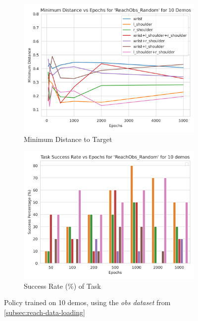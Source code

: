 \begin{figure}[htpb] %
  \centering
  \begin{subfigure}{0.45\linewidth}
    \centering
    \includegraphics[width=0.7\linewidth]{assets/cam-comb/reach-obs/ro_random-obs-mindist-10demos.png}
    \caption{Minimum Distance to Target}\label{subfig:ro-random-obs-dist-10}
  \end{subfigure}
  \begin{subfigure}{0.45\linewidth}
    \centering
    \includegraphics[width=0.7\linewidth]{assets/cam-comb/reach-obs/ro_random-obs-success-10demos.png}
    \caption{Success Rate (\%) of Task}\label{subfig:ro-random-obs-success-10}
  \end{subfigure}
  \caption{Policy trained on 10 demos, using the \emph{obs dataset} from \ref{subsec:reach-data-loading}}\label{fig:ro-random-obs-cams}
\end{figure}

